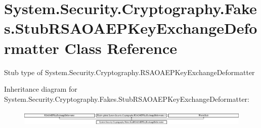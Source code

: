 \hypertarget{class_system_1_1_security_1_1_cryptography_1_1_fakes_1_1_stub_r_s_a_o_a_e_p_key_exchange_deformatter}{\section{System.\-Security.\-Cryptography.\-Fakes.\-Stub\-R\-S\-A\-O\-A\-E\-P\-Key\-Exchange\-Deformatter Class Reference}
\label{class_system_1_1_security_1_1_cryptography_1_1_fakes_1_1_stub_r_s_a_o_a_e_p_key_exchange_deformatter}
}


Stub type of System.\-Security.\-Cryptography.\-R\-S\-A\-O\-A\-E\-P\-Key\-Exchange\-Deformatter 


Inheritance diagram for System.\-Security.\-Cryptography.\-Fakes.\-Stub\-R\-S\-A\-O\-A\-E\-P\-Key\-Exchange\-Deformatter\-:\begin{figure}[H]
\begin{center}
\leavevmode
\includegraphics[height=0.760353cm]{class_system_1_1_security_1_1_cryptography_1_1_fakes_1_1_stub_r_s_a_o_a_e_p_key_exchange_deformatter}
\end{center}
\end{figure}
